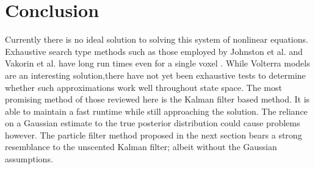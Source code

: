 \section{Conclusion}
Currently there is no ideal solution to solving this system of nonlinear
equations. Exhaustive search type methods such as those employed by
Johnston et al. and Vakorin et al. have long
run times even for a single voxel \cite{Johnston2008, Vakorin2007}. 
While Volterra models are an interesting
solution,there have not yet been exhaustive tests to determine whether
such approximations work well throughout state space. The most promising
method of those reviewed here is the Kalman filter based method. It is
able to maintain a fast runtime while still approaching the solution.
The reliance on a Gaussian estimate to the true posterior distribution could
cause problems however. 
The particle filter method proposed in the next section bears a strong 
resemblance to the unscented Kalman filter; albeit without the Gaussian 
assumptions. 
